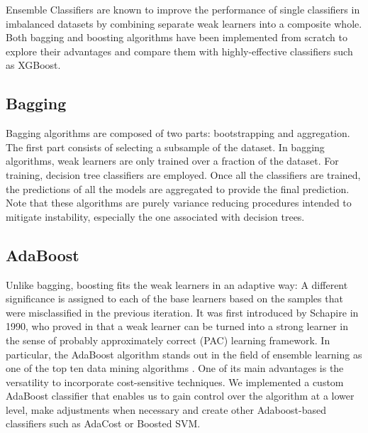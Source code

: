 \documentclass[conference]{IEEEtran}
\begin{document}
Ensemble Classifiers are known to improve the performance of single classifiers in imbalanced datasets \cite{ensembles_review} by combining separate weak learners into a composite whole. Both bagging and boosting algorithms have been implemented from scratch to explore their advantages and compare them with highly-effective classifiers such as XGBoost.

\subsection{Bagging}
Bagging algorithms are composed of two parts: bootstrapping and aggregation. The first part consists of selecting a subsample of the dataset. In bagging algorithms, weak learners are only trained over a fraction of the dataset. For training, decision tree classifiers are employed. Once all the classifiers are trained, the predictions of all the models are aggregated to provide the final prediction. Note that these algorithms are purely variance reducing procedures intended to mitigate instability, especially the one associated with decision trees.

\subsection{AdaBoost}
Unlike bagging, boosting fits the weak learners in an adaptive way: A different significance is assigned to each of the base learners based on the samples that were misclassified in the previous iteration. It was first introduced by Schapire in 1990, who proved in \cite{schapire} that a weak learner can be turned into a strong learner in the sense of probably approximately correct (PAC) learning framework. In particular, the AdaBoost algorithm stands out in the field of ensemble learning as one of the top ten data mining algorithms \cite{top10algo}. One of its main advantages is the versatility to incorporate cost-sensitive techniques. We implemented a custom AdaBoost classifier that enables us to gain control over the algorithm at a lower level, make adjustments when necessary and create other Adaboost-based classifiers such as AdaCost or Boosted SVM.
\end{document}
